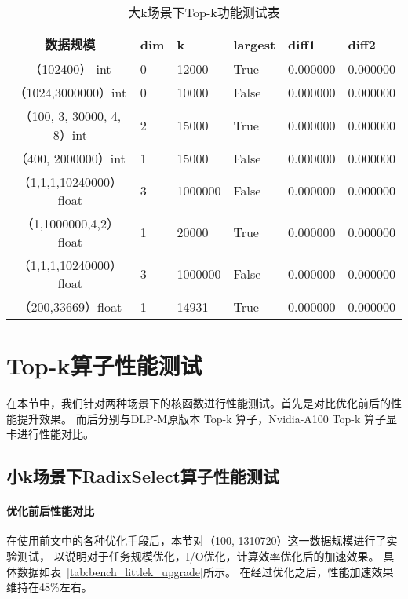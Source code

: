 \begin{table}
    \centering
    \caption{大k场景下Top-k功能测试表}
    \label{tab:presicionbigk}
    \begin{tabular}{clllll}
        \toprule
        数据规模       &dim  & k  & largest & diff1    & diff2 \\
        \midrule
        （102400） int&0&  12000     & True      & 0.000000 & 0.000000 \\
        （1024,3000000）int&0 & 10000 & False      & 0.000000 & 0.000000 \\
        （100, 3, 30000, 4, 8）int&2 & 15000 & True      & 0.000000 & 0.000000 \\
        （400, 2000000）int&1 & 15000 & False      & 0.000000 & 0.000000 \\
        
        （1,1,1,10240000）float &3& 1000000 & False      & 0.000000 & 0.000000 \\
        （1,1000000,4,2）float  &1 & 20000 & True      & 0.000000 & 0.000000 \\
        （1,1,1,10240000）float&3 & 1000000 & False      & 0.000000 & 0.000000 \\
        （200,33669）float&1 & 14931 & True      & 0.000000 & 0.000000 \\
    
    \bottomrule
    \end{tabular}
    \end{table}

\section{Top-k算子性能测试}
在本节中，我们针对两种场景下的核函数进行性能测试。首先是对比优化前后的性能提升效果。
而后分别与DLP-M原版本 Top-k 算子，Nvidia-A100 Top-k 算子显卡进行性能对比。
\subsection{小k场景下RadixSelect算子性能测试}
\paragraph{优化前后性能对比}
在使用前文中的各种优化手段后，本节对（100, 1310720）这一数据规模进行了实验测试，
以说明对于任务规模优化，I/O优化，计算效率优化后的加速效果。
具体数据如表~\ref{tab:bench_littlek_upgrade}所示。
在经过优化之后，性能加速效果维持在48\%左右。

